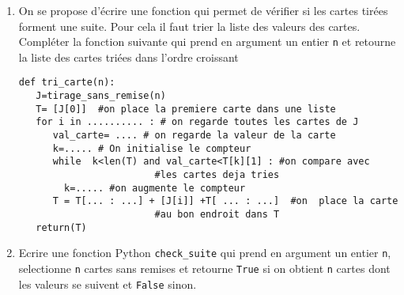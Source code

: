 \documentclass[a4paper, 11pt,reqno]{article}
\begin{document}
\begin{exercice}
\begin{enumerate}
\item On se propose d'écrire une fonction qui permet de  vérifier si les cartes tirées forment une suite. Pour cela il faut trier la liste des valeurs des cartes. Compléter la fonction suivante qui prend en argument un entier \texttt{n} et retourne la liste des cartes triées dans l'ordre croissant 

\begin{lstlisting}
def tri_carte(n):
   J=tirage_sans_remise(n)
   T= [J[0]]  #on place la premiere carte dans une liste 
   for i in .......... : # on regarde toutes les cartes de J
      val_carte= .... # on regarde la valeur de la carte 
      k=..... # On initialise le compteur 
      while  k<len(T) and val_carte<T[k][1] : #on compare avec 
      					#les cartes deja tries 
        k=..... #on augmente le compteur
      T = T[... : ...] + [J[i]] +T[ ... : ...]  #on  place la carte 
      					#au bon endroit dans T
   return(T) 
\end{lstlisting}

\item Ecrire une fonction Python  \texttt{check\_suite} qui  prend en argument un entier \texttt{n}, selectionne \texttt{n} cartes sans remises  et retourne \texttt{True} si on obtient \texttt{n}   cartes dont les valeurs se suivent et \texttt{False} sinon. 



\end{enumerate}
\end{exercice}
\end{document}
